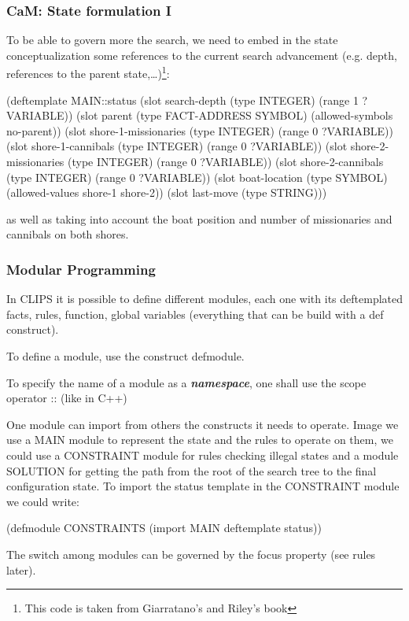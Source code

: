\documentclass[xcolor={usenames,dvipsnames,svgnames}, compress]{beamer}
\begin{document}
\begin{frame}[fragile]
  \frametitle{CaM: State formulation I}
  To be able to govern more the search, we need to embed in the state
  conceptualization some references to the current search advancement
  (e.g. depth, references to the parent state,\dots)\footnote{This
  code is taken from Giarratano's and Riley's book}: 
  \begin{clips-code}[numbers=none]
    (deftemplate MAIN::status 
        (slot search-depth (type INTEGER) (range 1 ?VARIABLE))
        (slot parent (type FACT-ADDRESS SYMBOL) (allowed-symbols no-parent))
        (slot shore-1-missionaries (type INTEGER) (range 0 ?VARIABLE))
        (slot shore-1-cannibals (type INTEGER) (range 0 ?VARIABLE))
        (slot shore-2-missionaries (type INTEGER) (range 0 ?VARIABLE))
        (slot shore-2-cannibals (type INTEGER) (range 0 ?VARIABLE))
        (slot boat-location (type SYMBOL) (allowed-values shore-1 shore-2))
        (slot last-move (type STRING)))   
  \end{clips-code}
  as well as taking into account the boat position and number of
  missionaries and cannibals on both shores.
      
\end{frame}

\begin{frame}[fragile]
  \frametitle{Modular Programming}
  In CLIPS it is possible to define different modules, each one with
  its deftemplated facts, rules, function, global variables (everything that can be
  build with a \textsf{def} construct).\par
  To define a module, use the construct \textsf{defmodule}.\par
  To specify the name of a module as a \textbf{\emph{namespace}}, one shall use the scope
  operator \textsf{::} (like in C++)\par\bigskip
  One module can import from others the constructs it needs to
  operate. Image we use a MAIN module to represent the state and the
  rules to operate on them, we could use a CONSTRAINT module for rules
  checking illegal states and a module SOLUTION for getting the path
  from the root of the search tree to the final configuration
  state. To import the \textsf{status} template in the CONSTRAINT
  module we could write:
  \begin{clips-code}[numbers=none]
    (defmodule CONSTRAINTS 
       (import MAIN deftemplate status))
  \end{clips-code}

  The switch among modules can be governed by the \textsf{focus}
  property (see rules later).
  \begin{clips-code}[numbers=none]
    
  \end{clips-code}
\end{frame}
\end{document}
